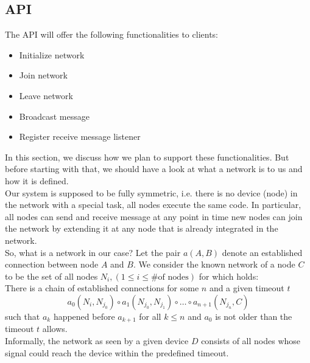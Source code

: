 \subsection{API}
	The API will offer the following functionalities to clients:
	\begin{itemize}
		\item {Initialize network}
		\item {Join network}
		\item {Leave network}
		\item {Broadcast message}
		\item {Register receive message listener}
	\end{itemize}
	In this section, we discuss how we plan to support these functionalities. But before starting with that, we should have a look at	what a network is to us and how it is defined.\\
	Our system is supposed to be fully symmetric, i.e. there is no device (node) in the network with a special task, all nodes execute the same code. In particular, all nodes can send and receive message at any point in time new nodes can join the network by extending it at any node that is already integrated in the network.\\
	So, what is a network in our case? Let the pair $a(A,B)$ denote an established connection between node $A$ and $B$. We consider the known network of a node $C$ to be the set of all nodes $N_i, (1 \leq i \leq \text{\# of nodes})$ for which holds:  \\
	There is a chain of established connections for some $n$ and a given timeout $t$
	\begin{displaymath}
		a_0(N_{i},N_{j_0}) \circ a_1(N_{j_0},N_{j_1}) \circ \ldots \circ a_{n+1}(N_{j_n},C)
	\end{displaymath}
	such that $a_k$ happened before $a_{k+1}$ for all $k \leq n$ and $a_0$ is not older than the timeout $t$ allows. \\
	Informally, the network as seen by a given device $D$ consists of all nodes whose signal could reach the device within the predefined timeout. \\ \\
			
